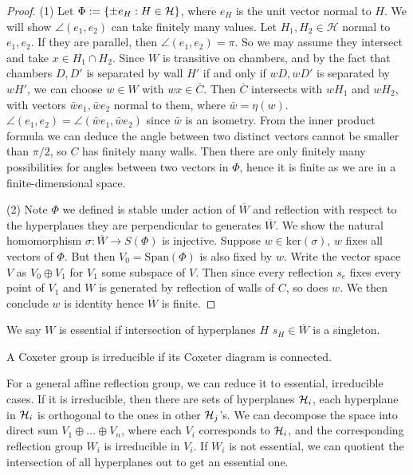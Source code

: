 \documentclass[../main.tex]{subfiles}
\begin{document}
\begin{proof}
    (1) Let $\Phi := \{\pm e_H:H\in \mathcal{H}\}$, where $e_H$ is the unit vector normal to $H$. We will show $\angle(e_1,e_2)$ can take finitely many values. Let $H_1,H_2 \in \mathcal H$ normal to $e_1,e_2$. If they are parallel, then $\angle(e_1,e_2)=\pi$. So we may assume they intersect and take $x\in H_1\cap H_2$. Since $W$ is transitive on chambers, and by the fact that chambers $D,D'$ is separated by wall $H'$ if and only if $wD,wD'$ is separated by $wH'$, we can choose $w \in W$ with $wx\in \overline C$. Then $\overline C$ intersects with $wH_1$ and $wH_2$, with vectors $\bar we_1,\bar we_2$ normal to them, where $\bar w=\eta(w)$. $\angle(e_1,e_2)=\angle(\bar we_1,\bar we_2)$ since $\bar w$ is an isometry.   From the inner product formula we can deduce the angle between two distinct vectors cannot be smaller than $\pi/2$, so $C$ has finitely many walls. Then there are only finitely many possibilities for angles between two vectors in $\Phi$, hence it is finite as we are in a finite-dimensional space.

    (2) Note $\Phi$ we defined is stable under action of $\overline W$ and reflection with respect to the hyperplanes they are perpendicular to generates $\overline W$. We show the natural homomorphism $\sigma:\overline W \rightarrow S(\Phi)$ is injective. Suppose $w\in \text{ker}(\sigma)$, $w$ fixes all vectors of $\Phi$. But then $V_0=\text{Span}(\Phi)$ is also fixed by $w$. Write the vector space $V$ as $V_0\oplus V_1$ for $V_1$ some subspace of $V$. Then since every reflection $s_e$ fixes every point of $V_1$ and $W$ is generated by reflection of walls of $C$, so does $w$. We then conclude $w$ is identity hence $\overline W$ is finite.
\end{proof}

\begin{definition}
    We say $W$ is essential if intersection of hyperplanes $H$ $s_H \in \overline W$ is a singleton.
\end{definition}

\begin{definition}
    A Coxeter group is irreducible if its Coxeter diagram is connected.
\end{definition}

For a general affine reflection group, we can reduce it to essential, irreducible cases. If it is irreducible, then there are sets of hyperplanes $\mathcal{H}_i$, each hyperplane in $\mathcal{H}_i$ is orthogonal to the ones in other $\mathcal{H}_j$'s. We can decompose the space into direct sum $V_1 \oplus \dots \oplus V_n$, where each $V_i$ corresponds to $\mathcal{H}_i$, and the corresponding reflection group $W_i$ is irreducible in $V_i$. If $W_i$ is not essential, we can quotient the intersection of all hyperplanes out to get an essential one.
\end{document}
